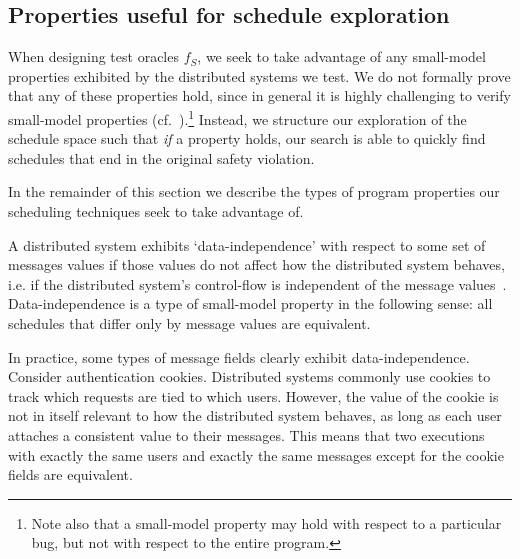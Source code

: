 \subsection{Properties useful for schedule exploration}

When designing test oracles $f_{S}$, we seek to take advantage of any small-model
properties exhibited by the distributed systems we test. We do not
formally prove that any of these properties hold, since in general it is
highly challenging to verify small-model
properties (cf.~\cite{rabin1958recursively,de1979social}).\footnote{Note also that a small-model property
may hold with respect to a particular bug, but not with respect to the entire program.}
Instead, we structure our
exploration of the schedule space such that {\em if} a property holds,
our search is able to quickly find schedules that end in the original safety
violation.

In the remainder of this section we describe the types of program properties our
scheduling techniques seek to take advantage of.


 A distributed system exhibits
`data-independence' with respect to some set of messages values if those values 
do not affect how the distributed system behaves, i.e. if
the distributed system's control-flow is independent of the message values~\cite{shacham2014verifying,wolper}.
Data-independence is a type of small-model property in the following sense:
all schedules that differ only by message values are equivalent.

In practice, some types of message fields clearly exhibit
data-independence. Consider authentication cookies. Distributed systems commonly
use cookies to track which requests are tied to which users. However, the
value of the cookie is not in itself relevant to how the distributed system
behaves, as long as each user attaches a consistent value to their messages. This means that two executions
with exactly the same users and exactly the same messages except for the
cookie fields are equivalent.

